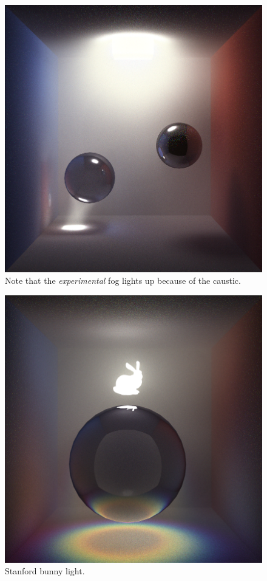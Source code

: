 \documentclass[12pt]{article}
\begin{document}
\begin{figure} 
\centering
  \includegraphics[width = 6 in]{fig9.png}
  \caption{ Note that the {\textit{experimental}} fog lights up because of the caustic.
}
\end{figure}


\begin{figure} 
\centering
  \includegraphics[width = 6 in]{fig10.png}
  \caption{ Stanford bunny light.
}
\end{figure}
\end{document}
